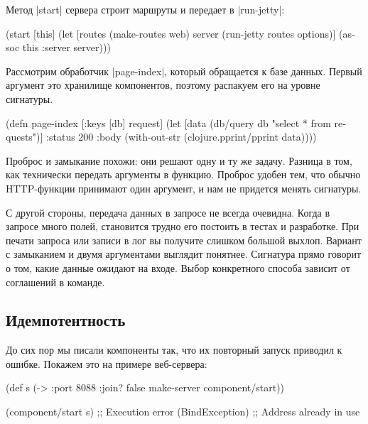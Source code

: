 Метод \spverb|start| сервера строит маршруты и передает в \spverb|run-jetty|:

\begin{english}
  \begin{clojure}
(start [this]
  (let [routes (make-routes web)
        server (run-jetty routes options)]
    (assoc this :server server)))
  \end{clojure}
\end{english}

Рассмотрим обработчик \spverb|page-index|, который обращается к базе
данных. Первый аргумент это хранилище компонентов, поэтому распакуем его на
уровне сигнатуры.

\begin{english}
  \begin{clojure}
(defn page-index
  [{:keys [db]} request]
  (let [data (db/query db "select * from requests")]
    {:status 200
     :body (with-out-str
             (clojure.pprint/pprint data))}))
  \end{clojure}
\end{english}

Проброс и замыкание похожи: они решают одну и ту же задачу. Разница в том, как
технически передать аргументы в функцию. Проброс удобен тем, что обычно
HTTP-функции принимают один аргумент, и нам не придется менять сигнатуры.

С другой стороны, передача данных в запросе не всегда очевидна. Когда в запросе
много полей, становится трудно его постоить в тестах и разработке. При печати
запроса или записи в лог вы получите слишком большой выхлоп. Вариант с
замыканием и двумя аргументами выглядит понятнее. Сигнатура прямо говорит о том,
какие данные ожидают на входе. Выбор конкретного способа зависит от соглашений в
команде.

\subsection{Идемпотентность}

До сих пор мы писали компоненты так, что их повторный запуск приводил к
ошибке. Покажем это на примере веб-сервера:

\begin{english}
  \begin{clojure}
(def s (-> {:port 8088 :join? false}
           make-server
           component/start))

(component/start s)
;; Execution error (BindException)
;; Address already in use
  \end{clojure}
\end{english}

